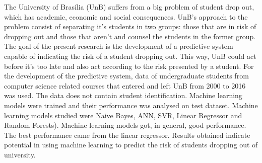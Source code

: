 The University of Brasília (UnB) suffers from a big problem of student drop out, which has
academic, economic and social consequences. UnB's approach to the problem consist
of separating it's students in two groups: those that are in risk of dropping out
and those that aren't and counsel the students in the former group. 
The goal of the present research is the development of a predictive system
capable of indicating the risk of a student dropping out. This way,
UnB could act before it's too late and also act according to the risk presented by a
student. 
For the development of the predictive system, data of undergraduate students from
computer science related courses that entered and left UnB from 2000 to 2016 was
used. The data does not contain student identification. Machine learning models were
trained and their performance was analysed on test dataset. Machine learning models
studied were Naive Bayes, ANN, SVR, Linear Regressor and Random Forests).
Machine learning models got, in general, good performance. The best performance came
from the linear regressor. Results obtained indicate potential in using machine
learning to predict the risk of students dropping out of university. 
